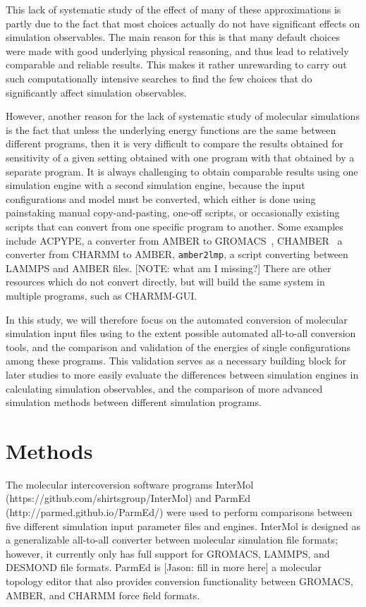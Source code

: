 This lack of systematic study of the effect of many of these
approximations is partly due to the fact that most choices actually do
not have significant effects on simulation observables. The main
reason for this is that many default choices were made with good
underlying physical reasoning, and thus lead to relatively comparable
and reliable results. This makes it rather unrewarding to carry out
such computationally intensive searches to find the few choices that
do significantly affect simulation observables.  

However, another reason for the lack of systematic study of molecular
simulations is the fact that unless the underlying energy functions
are the same between different programs, then it is very difficult to
compare the results obtained for sensitivity of a given setting
obtained with one program with that obtained by a separate program.
It is always challenging to obtain comparable results using one
simulation engine with a second simulation engine, because the input
configurations and model must be converted, which either is done using
painstaking manual copy-and-pasting, one-off scripts, or occasionally
existing scripts that can convert from one specific program to
another.  Some examples include ACPYPE, a converter from AMBER to
GROMACS~\citep{sousa_da_silva_acpype_2012},
CHAMBER~\citep{crowley_chamber:_2009} a converter from CHARMM to
AMBER, {\tt amber2lmp}, a script converting between LAMMPS and AMBER
files. [NOTE: what am I missing?] There are other resources which do not convert directly, but
will build the same system in multiple programs, such as
CHARMM-GUI.~\citep{lee_charmm-gui_2016}

In this study, we will therefore focus on the automated conversion of
molecular simulation input files using to the extent possible
automated all-to-all conversion tools, and the comparison and
validation of the energies of single configurations among these
programs.  This validation serves as a necessary building block for
later studies to more easily evaluate the differences between
simulation engines in calculating simulation observables, and the
comparison of more advanced simulation methods between different
simulation programs.

\section*{Methods}
\begin{sloppypar}
The molecular intercoversion software programs InterMol
(https://github.com/shirtsgroup/InterMol) and ParmEd
(http://parmed.github.io/ParmEd/) were used to perform comparisons
between five different simulation input parameter files and engines.
InterMol is designed as a generalizable all-to-all converter between
molecular simulation file formats; however, it currently only has full
support for GROMACS, LAMMPS, and DESMOND file formats.  ParmEd is
[Jason: fill in more here] a molecular topology editor that also
provides conversion functionality between GROMACS, AMBER, and CHARMM
force field formats.
\end{sloppypar}

